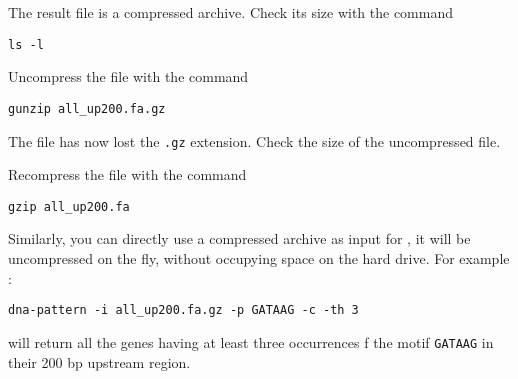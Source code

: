 The result file is a compressed archive. Check its size with the
command 
\begin{verbatim}
ls -l
\end{verbatim}

Uncompress the file with the command 
\begin{verbatim}
gunzip all_up200.fa.gz
\end{verbatim}

The file has now lost the \texttt{.gz} extension. Check the size of the
uncompressed file.

Recompress the file with the command
\begin{verbatim}
gzip all_up200.fa
\end{verbatim}

Similarly, you can directly use a compressed archive as input for
\RSAT, it will be uncompressed on the fly, without occupying space on
the hard drive. For example :

\begin{verbatim}
dna-pattern -i all_up200.fa.gz -p GATAAG -c -th 3
\end{verbatim}

will return all the genes having at least three occurrences f the
motif \texttt{GATAAG} in their 200 bp upstream region.

